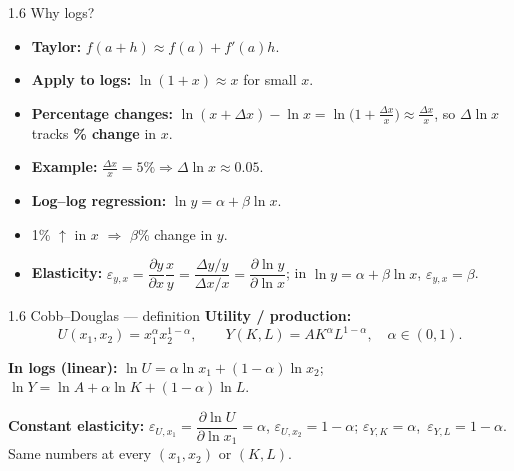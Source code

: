 \documentclass[11pt,aspectratio=169]{beamer}
\begin{document}
\begin{frame}{1.6 Why logs?}
  \small
  \begin{itemize}
    \item \textbf{Taylor:}\quad
      $f(a+h)\approx f(a)+f'(a)h$.
    \item \textbf{Apply to logs:}\quad
      $\ln(1+x)\approx x$ for small $x$.
    \item \textbf{Percentage changes:}\quad
      $\ln(x+\Delta x)-\ln x=\ln\!\bigl(1+\tfrac{\Delta x}{x}\bigr)\approx \tfrac{\Delta x}{x}$,
      so $\Delta\ln x$ tracks \textbf{\% change} in $x$.
    \item \textbf{Example:}\quad
      $\tfrac{\Delta x}{x}=5\%\Rightarrow \Delta\ln x\approx 0.05$.
    \item \textbf{Log--log regression:}\quad
      $\ln y=\alpha+\beta\ln x$.
    \item 1\% $\uparrow$ in $x$ $\Rightarrow$ $\beta$\% change in $y$.
    \item \textbf{Elasticity:}\quad
      $\varepsilon_{y,x}=\dfrac{\partial y}{\partial x}\dfrac{x}{y}
      =\dfrac{\Delta y/y}{\Delta x/x}
      =\dfrac{\partial\ln y}{\partial\ln x}$;\quad
      in $\ln y=\alpha+\beta\ln x$, $\varepsilon_{y,x}=\beta$.
  \end{itemize}
\end{frame}

\begin{frame}{1.6 Cobb--Douglas --- definition}
  \small
  \textbf{Utility / production:}
  \[
    U(x_1,x_2)=x_1^{\alpha}x_2^{1-\alpha},\qquad
    Y(K,L)=A K^{\alpha}L^{1-\alpha},\quad \alpha\in(0,1).
  \]

  \medskip
  \textbf{In logs (linear):}\quad
  $\ln U=\alpha\ln x_1+(1-\alpha)\ln x_2$;\quad
  $\ln Y=\ln A+\alpha\ln K+(1-\alpha)\ln L$.

  \medskip
  \textbf{Constant elasticity:}
  $\varepsilon_{U,x_1}=\dfrac{\partial\ln U}{\partial\ln x_1}=\alpha$,\quad
  $\varepsilon_{U,x_2}=1-\alpha$;\quad
  $\varepsilon_{Y,K}=\alpha$,\ $\varepsilon_{Y,L}=1-\alpha$.
  {\scriptsize Same numbers at every $(x_1,x_2)$ or $(K,L)$.}
\end{frame}
\end{document}
